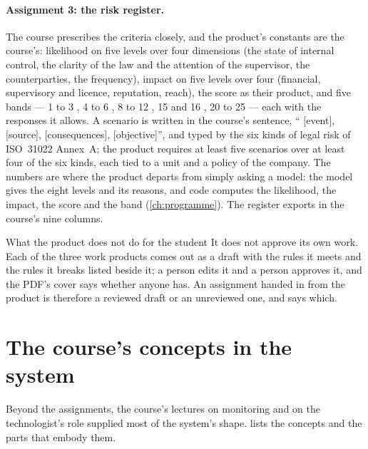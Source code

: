 \paragraph{Assignment 3: the risk register.} The course prescribes the criteria closely, and
the product's constants are the course's: likelihood on five levels over four dimensions (the
state of internal control, the clarity of the law and the attention of the supervisor, the
counterparties, the frequency), impact on five levels over four (financial, supervisory and
licence, reputation, reach), the score as their product, and five bands --- 1 to 3
, 4 to 6 , 8 to 12 , 15 and 16 ,
20 to 25  --- each with the responses it allows. A scenario is written in the
course's sentence, \enquote{ [event],  [source],  [consequences],  [objective]}, and typed by the six kinds of legal
risk of ISO~31022 Annex~A; the product requires at least five scenarios over at least four of
the six kinds, each tied to a unit and a policy of the company. The numbers are where the
product departs from simply asking a model: the model gives the eight levels and its reasons,
and code computes the likelihood, the impact, the score and the band (\cref{ch:programme}).
The register exports in the course's nine columns.

\begin{humanbox}{What the product does not do for the student}
It does not approve its own work. Each of the three work products comes out as a draft with
the rules it meets and the rules it breaks listed beside it; a person edits it and a person
approves it, and the PDF's cover says whether anyone has. An assignment handed in from the
product is therefore a reviewed draft or an unreviewed one, and says which.
\end{humanbox}

\section{The course's concepts in the system}\label{sec:course:concepts}

Beyond the assignments, the course's lectures on monitoring and on the technologist's role
supplied most of the system's shape.  lists the concepts and the
parts that embody them.

